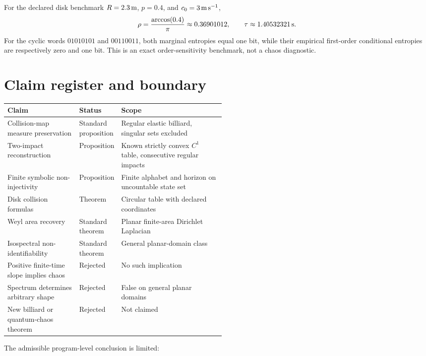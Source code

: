\documentclass[11pt,a4paper]{article}
\theoremstyle{definition}
\theoremstyle{plain}
\theoremstyle{remark}
\begin{document}
For the declared disk benchmark \(R=2.3\,{\rm m}\), \(p=0.4\), and
\(c_0=3\,{\rm m\,s^{-1}}\),
\[
\rho=\frac{\arccos(0.4)}{\pi}\approx0.36901012,\qquad
\tau\approx1.40532321\,{\rm s}.
\]
For the cyclic words \(01010101\) and \(00110011\), both marginal
entropies equal one bit, while their empirical first-order
conditional entropies are respectively zero and one bit. This is an
exact order-sensitivity benchmark, not a chaos diagnostic.

\section{Claim register and boundary}

\begin{table}[ht]
\centering
\small
\begin{tabularx}{\linewidth}{L{0.33\linewidth} L{0.18\linewidth} Y}
\toprule
Claim & Status & Scope \\
\midrule
Collision-map measure preservation &
Standard proposition &
Regular elastic billiard, singular sets excluded \\
Two-impact reconstruction &
Proposition &
Known strictly convex \(C^1\) table, consecutive regular impacts \\
Finite symbolic non-injectivity &
Proposition &
Finite alphabet and horizon on uncountable state set \\
Disk collision formulas &
Theorem &
Circular table with declared coordinates \\
Weyl area recovery &
Standard theorem &
Planar finite-area Dirichlet Laplacian \\
Isospectral non-identifiability &
Standard theorem &
General planar-domain class \\
Positive finite-time slope implies chaos &
Rejected &
No such implication \\
Spectrum determines arbitrary shape &
Rejected &
False on general planar domains \\
New billiard or quantum-chaos theorem &
Rejected &
Not claimed \\
\bottomrule
\end{tabularx}
\end{table}

The admissible program-level conclusion is limited:

\begin{center}
\end{center}
\end{document}

